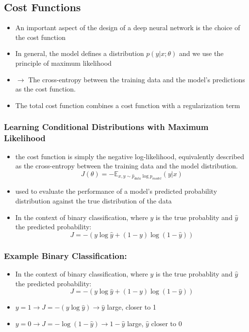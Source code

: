 \documentclass{beamer}
\begin{document}
\subsection{Cost Functions}
\begin{frame}
	\begin{itemize}
		\item An important aspect of the design of a deep neural network is the choice of the cost function
		\item In general, the model defines a distribution $p(y|x;\theta)$ and we use the principle of maximum likelihood
		\item $\rightarrow$ The cross-entropy between the training data and the model's predictions as the cost function.
		\item The total cost function combines a cost function with a regularization term
	\end{itemize}
\end{frame}
\begin{frame}
	\frametitle{Learning Conditional Distributions with Maximum Likelihood}
	\begin{itemize}
		\item the cost function is simply the negative log-likelihood, equivalently described as the cross-entropy between the training data and the model distribution.
			$$ J(\theta)= -\mathbb{E}_{x,y\sim \hat{p}_{data}\log p_{model}}(y|x)$$
		\item used to evaluate the performance of a model's predicted probability distribution against the true distribution of the data
		\item In the context of binary classification, where $y$ is the true probablity and $\hat{y}$ the predicted probability:
			$$ J = -(y\log \hat{y} + (1-y) \log (1- \hat{y}))$$
	\end{itemize}	
\end{frame}
\begin{frame}
	\frametitle{Example Binary Classification:}
	\begin{itemize}
\item In the context of binary classification, where $y$ is the true probablity and $\hat{y}$ the predicted probability:
			$$ J = -(y\log \hat{y} + (1-y) \log (1- \hat{y}))$$
		\item $y = 1 \rightarrow J =-(y\log \hat{y}) \rightarrow \hat{y}$ large, closer to 1
		\item $y = 0 \rightarrow J =-\log (1-\hat{y}) \rightarrow 1- \hat{y}$ large, $\hat{y}$ closer to 0



		
	\end{itemize}
	
\end{frame}
\end{document}
